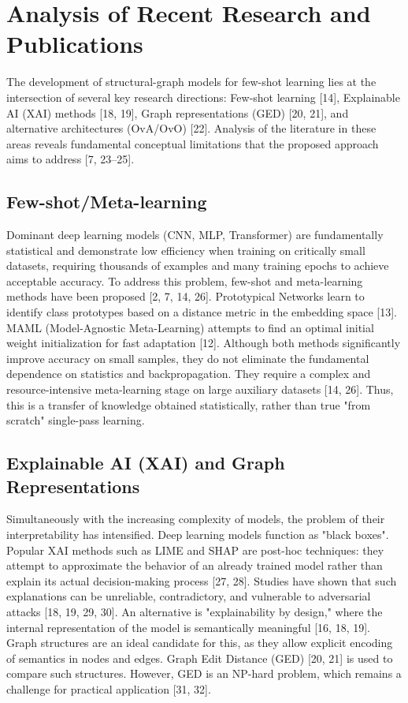 \documentclass[conference]{IEEEtran}
\begin{document}
\section{Analysis of Recent Research and Publications}
The development of structural-graph models for few-shot learning lies at the intersection of several key research directions: Few-shot learning [14], Explainable AI (XAI) methods [18, 19], Graph representations (GED) [20, 21], and alternative architectures (OvA/OvO) [22]. Analysis of the literature in these areas reveals fundamental conceptual limitations that the proposed approach aims to address [7, 23--25].

\subsection{Few-shot/Meta-learning}
Dominant deep learning models (CNN, MLP, Transformer) are fundamentally statistical and demonstrate low efficiency when training on critically small datasets, requiring thousands of examples and many training epochs to achieve acceptable accuracy. To address this problem, few-shot and meta-learning methods have been proposed [2, 7, 14, 26]. Prototypical Networks learn to identify class prototypes based on a distance metric in the embedding space [13]. MAML (Model-Agnostic Meta-Learning) attempts to find an optimal initial weight initialization for fast adaptation [12]. Although both methods significantly improve accuracy on small samples, they do not eliminate the fundamental dependence on statistics and backpropagation. They require a complex and resource-intensive meta-learning stage on large auxiliary datasets [14, 26]. Thus, this is a transfer of knowledge obtained statistically, rather than true "from scratch" single-pass learning.

\subsection{Explainable AI (XAI) and Graph Representations}
Simultaneously with the increasing complexity of models, the problem of their interpretability has intensified. Deep learning models function as "black boxes". Popular XAI methods such as LIME and SHAP are post-hoc techniques: they attempt to approximate the behavior of an already trained model rather than explain its actual decision-making process [27, 28]. Studies have shown that such explanations can be unreliable, contradictory, and vulnerable to adversarial attacks [18, 19, 29, 30]. An alternative is "explainability by design," where the internal representation of the model is semantically meaningful [16, 18, 19]. Graph structures are an ideal candidate for this, as they allow explicit encoding of semantics in nodes and edges. Graph Edit Distance (GED) [20, 21] is used to compare such structures. However, GED is an NP-hard problem, which remains a challenge for practical application [31, 32].
\end{document}
